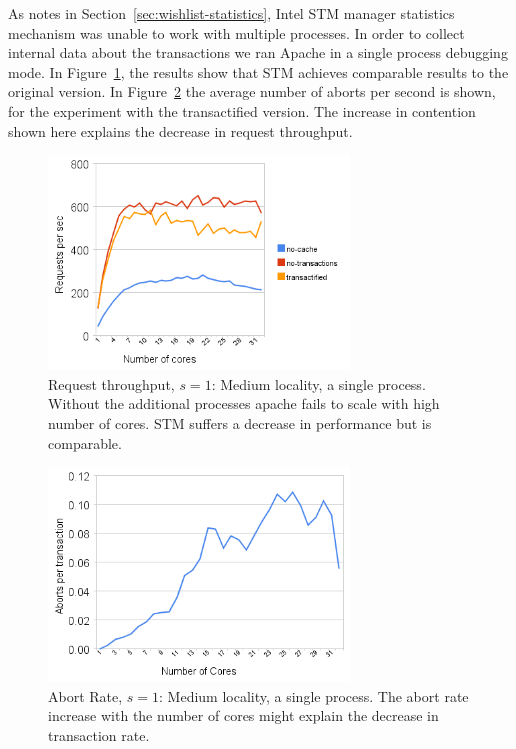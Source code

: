 \documentclass[preprint,natbib,11pt]{sigplanconf}
\begin{document}
As notes in Section~\ref{sec:wishlist-statistics}, Intel STM manager statistics
mechanism was unable to work with multiple processes. In order to collect
internal data about the transactions we ran Apache in a single process debugging
mode. In Figure~\ref{fig:one-process-request-throughput}, the results show that
STM achieves comparable results to the original version. In
Figure~\ref{fig:one-process-abort-rate} the average number of aborts per second
is shown, for the experiment with the transactified version. The increase in
contention shown here explains the decrease in request throughput.

\begin{figure}
 \begin{center}
  \includegraphics[width=8cm]{transaction-rate-single-process.png}
 \end{center}
 \caption{Request throughput, $s = 1$: Medium locality, a single process.
          Without the additional processes apache fails to scale with high
          number of cores. STM suffers a decrease in performance but is
          comparable.} 
 \label{fig:one-process-request-throughput}
\end{figure}
\begin{figure}
 \begin{center}
  \includegraphics[width=8cm]{abort-rate.png}
 \end{center}
 \caption{Abort Rate, $s = 1$: Medium locality, a single process.
          The abort rate increase with the number of cores might explain the 
          decrease in transaction rate.}
 \label{fig:one-process-abort-rate}
\end{figure}
\end{document}
